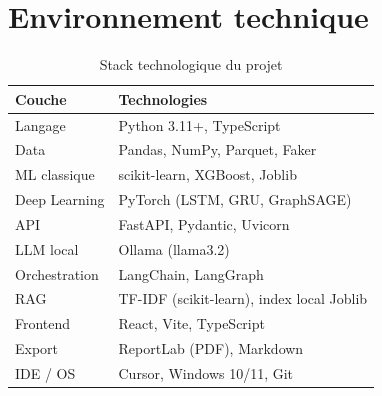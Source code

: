 \section{Environnement technique}

\begin{table}[H]
  \centering
  \caption{Stack technologique du projet}
  \begin{tabular}{|l|l|}
    \hline
    \textbf{Couche} & \textbf{Technologies} \\
    \hline
    Langage & Python 3.11+, TypeScript \\
    \hline
    Data & Pandas, NumPy, Parquet, Faker \\
    \hline
    ML classique & scikit-learn, XGBoost, Joblib \\
    \hline
    Deep Learning & PyTorch (LSTM, GRU, GraphSAGE) \\
    \hline
    API & FastAPI, Pydantic, Uvicorn \\
    \hline
    LLM local & Ollama (llama3.2) \\
    \hline
    Orchestration & LangChain, LangGraph \\
    \hline
    RAG & TF-IDF (scikit-learn), index local Joblib \\
    \hline
    Frontend & React, Vite, TypeScript \\
    \hline
    Export & ReportLab (PDF), Markdown \\
    \hline
    IDE / OS & Cursor, Windows 10/11, Git \\
    \hline
  \end{tabular}
\end{table}
